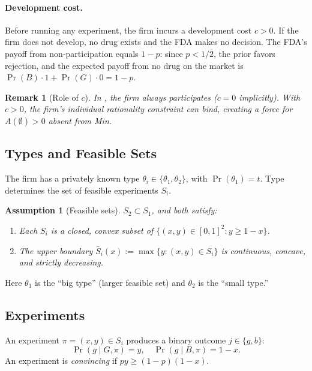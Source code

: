\documentclass[12pt,a4paper]{article}
\newtheorem{remark}{Remark}
\newtheorem{assumption}{Assumption}
\begin{document}
\paragraph{Development cost.}
Before running any experiment, the firm incurs a development
cost $c > 0$. If the firm does not develop, no drug exists
and the FDA makes no decision. The FDA's payoff from
non-participation equals $1 - p$: since $p < 1/2$, the prior
favors rejection, and the expected payoff from no drug on the
market is $\Pr(B) \cdot 1 + \Pr(G) \cdot 0 = 1 - p$.

\begin{remark}[Role of $c$]
In \citet{min2023}, the firm always participates
($c = 0$ implicitly). With $c > 0$, the firm's individual
rationality constraint can bind, creating a force for
$A(\emptyset) > 0$ absent from Min.
\end{remark}


\subsection{Types and Feasible Sets}

The firm has a privately known type
$\theta_i \in \{\theta_1, \theta_2\}$, with
$\Pr(\theta_1) = t$. Type determines the set of feasible
experiments $S_i$.

\begin{assumption}[Feasible sets]\label{as:feasible}
$S_2 \subset S_1$, and both satisfy:
\begin{enumerate}
  \item[(i)] Each $S_i$ is a closed, convex subset of
    $\{(x, y) \in [0,1]^2 : y \geq 1 - x\}$.
  \item[(ii)] The upper boundary
    $\bar{S}_i(x) := \max\{y : (x,y) \in S_i\}$ is
    continuous, concave, and strictly decreasing.
\end{enumerate}
\end{assumption}

Here $\theta_1$ is the ``big type'' (larger feasible set)
and $\theta_2$ is the ``small type.''


\subsection{Experiments}

An experiment $\pi = (x, y) \in S_i$ produces a binary outcome
$j \in \{g, b\}$:
\[
  \Pr(g \mid G, \pi) = y, \quad
  \Pr(g \mid B, \pi) = 1 - x.
\]
An experiment is \emph{convincing} if
$py \geq (1 - p)(1 - x)$.
\end{document}
